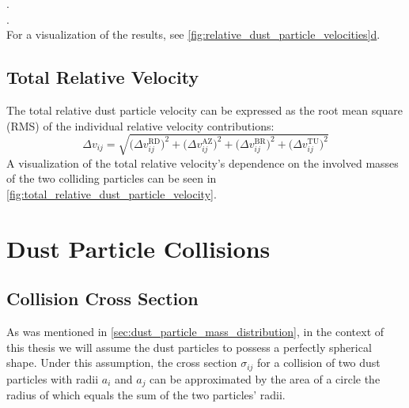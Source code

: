         . \\
        . \\

        For a visualization of the results, see \hyperref[fig:relative_dust_particle_velocities]
        {\cref*{fig:relative_dust_particle_velocities}d}.

    \subsection{Total Relative Velocity}

        The total relative dust particle velocity can be expressed as the root mean square (RMS) of 
        the individual relative velocity contributions:
        \begin{equation}
            \Delta v_{ij}
                = \sqrt{
                    \big(\Delta v^\text{RD}_{ij}\big)^2
                    + \big(\Delta v^\text{AZ}_{ij}\big)^2
                    + \big(\Delta v^\text{BR}_{ij}\big)^2
                    + \big(\Delta v^\text{TU}_{ij}\big)^2
                }
        \end{equation}
        A visualization of the total relative velocity's dependence on the involved masses of the
        two colliding particles can be seen in \cref{fig:total_relative_dust_particle_velocity}.

        
        


\clearpage\section{Dust Particle Collisions}

    \subsection{Collision Cross Section}
        
        As was mentioned in \cref{sec:dust_particle_mass_distribution}, in the context of 
        this thesis we will assume the dust particles to possess a perfectly spherical shape. 
        Under this assumption, the cross section $\sigma_{ij}$ for a collision of two dust 
        particles with radii $a_i$ and $a_j$ can be approximated by the area of a circle the 
        radius of which equals the sum of the two particles' radii. \\

